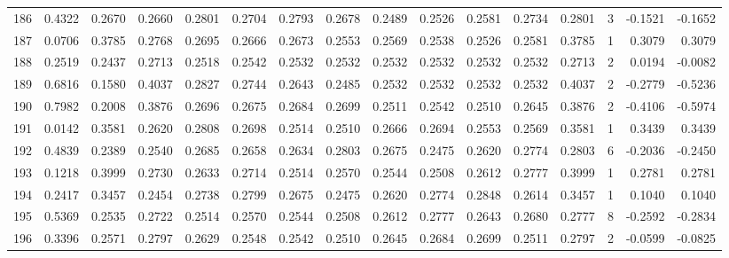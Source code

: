 \begin{tabular}{lrrrrrrrrrrrrrrr}
186 &      0.4322 &  0.2670 &  0.2660 &  0.2801 &  0.2704 &  0.2793 &  0.2678 &  0.2489 &  0.2526 &  0.2581 &   0.2734 &     0.2801 &      3 &                   -0.1521 &                    -0.1652 \\
187 &      0.0706 &  0.3785 &  0.2768 &  0.2695 &  0.2666 &  0.2673 &  0.2553 &  0.2569 &  0.2538 &  0.2526 &   0.2581 &     0.3785 &      1 &                    0.3079 &                     0.3079 \\
188 &      0.2519 &  0.2437 &  0.2713 &  0.2518 &  0.2542 &  0.2532 &  0.2532 &  0.2532 &  0.2532 &  0.2532 &   0.2532 &     0.2713 &      2 &                    0.0194 &                    -0.0082 \\
189 &      0.6816 &  0.1580 &  0.4037 &  0.2827 &  0.2744 &  0.2643 &  0.2485 &  0.2532 &  0.2532 &  0.2532 &   0.2532 &     0.4037 &      2 &                   -0.2779 &                    -0.5236 \\
190 &      0.7982 &  0.2008 &  0.3876 &  0.2696 &  0.2675 &  0.2684 &  0.2699 &  0.2511 &  0.2542 &  0.2510 &   0.2645 &     0.3876 &      2 &                   -0.4106 &                    -0.5974 \\
191 &      0.0142 &  0.3581 &  0.2620 &  0.2808 &  0.2698 &  0.2514 &  0.2510 &  0.2666 &  0.2694 &  0.2553 &   0.2569 &     0.3581 &      1 &                    0.3439 &                     0.3439 \\
192 &      0.4839 &  0.2389 &  0.2540 &  0.2685 &  0.2658 &  0.2634 &  0.2803 &  0.2675 &  0.2475 &  0.2620 &   0.2774 &     0.2803 &      6 &                   -0.2036 &                    -0.2450 \\
193 &      0.1218 &  0.3999 &  0.2730 &  0.2633 &  0.2714 &  0.2514 &  0.2570 &  0.2544 &  0.2508 &  0.2612 &   0.2777 &     0.3999 &      1 &                    0.2781 &                     0.2781 \\
194 &      0.2417 &  0.3457 &  0.2454 &  0.2738 &  0.2799 &  0.2675 &  0.2475 &  0.2620 &  0.2774 &  0.2848 &   0.2614 &     0.3457 &      1 &                    0.1040 &                     0.1040 \\
195 &      0.5369 &  0.2535 &  0.2722 &  0.2514 &  0.2570 &  0.2544 &  0.2508 &  0.2612 &  0.2777 &  0.2643 &   0.2680 &     0.2777 &      8 &                   -0.2592 &                    -0.2834 \\
196 &      0.3396 &  0.2571 &  0.2797 &  0.2629 &  0.2548 &  0.2542 &  0.2510 &  0.2645 &  0.2684 &  0.2699 &   0.2511 &     0.2797 &      2 &                   -0.0599 &                    -0.0825 \\

\end{tabular}
